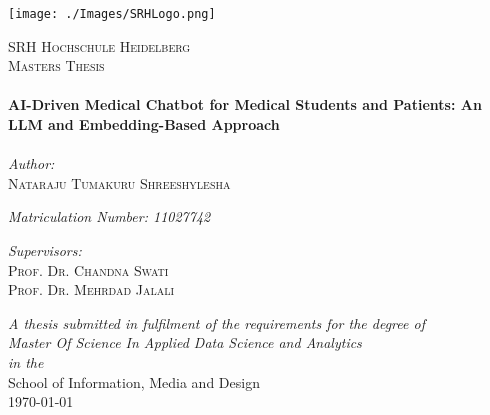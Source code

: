 \documentclass[12pt, oneside]{Thesis}
\def\ttitle{AI-Driven Medical Chatbot for Medical Students and Patients: An LLM and Embedding-Based Approach}
\def\authornames{Nataraju Tumakuru Shreeshylesha}
\def\supname{Prof. Dr. Chandna Swati\\ Prof. Dr. Mehrdad Jalali}
\def\degreename{Master Of Science In Applied Data Science and Analytics}
\def\univname{SRH Hochschule Heidelberg}
\def\deptname{School of Information, Media and Design}
\begin{document}
\begin{titlepage}
    \begin{center}
      \texttt{[image: ./Images/SRHLogo.png]} %

        \textsc{\LARGE \univname}\\[1.5cm] %
        \textsc{\Large Masters Thesis}\\[0.5cm] %

        \HRule \\[0.4cm] %
        {\huge \bfseries \ttitle}\\[0.4cm] %
        \HRule \\[1.5cm] %
        \large
        \emph{Author:}\\[0.2cm]
        \textsc{\authornames} %

        \emph{Matriculation Number: 11027742} 

        \large
        \emph{Supervisors:} \\[0.2cm]
        \textsc{\supname} %

      
        \large \textit{A thesis submitted in fulfilment of the requirements for the degree of \\\degreename}\\[0.3cm] %
        \textit{in the}\\[0.2cm]

        \deptname\\[1.2cm] %
        {\large \mydateformat\today}\\[1cm]  %
        

        \vfill
    \end{center}
  \end{titlepage}
\end{document}
